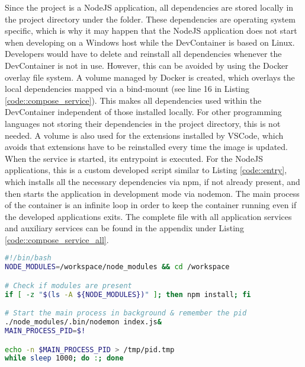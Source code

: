         Since the project is a NodeJS application, all dependencies are stored locally in the project directory under the  folder. These dependencies are operating system specific, which is why it may happen that the NodeJS application does not start when developing on a Windows host while the DevContainer is based on Linux. Developers would have to delete and reinstall all dependencies whenever the DevContainer is not in use. However, this can be avoided by using the Docker overlay file system. A volume managed by Docker is created, which overlays the local dependencies mapped via a bind-mount (see line 16 in Listing \ref{code::compose_service}). This makes all dependencies used within the DevContainer independent of those installed locally. For other programming languages not storing their dependencies in the project directory, this is not needed. A volume is also used for the extensions installed by VSCode, which avoids that extensions have to be reinstalled every time the image is updated.\newline
        When the service is started, its entrypoint is executed. For the NodeJS applications, this is a custom developed script similar to Listing \ref{code::entry}, which installs all the necessary dependencies via npm, if not already present, and then starts the application in development mode via nodemon. The main process of the container is an infinite loop in order to keep the container running even if the developed applications exits. The complete  file with all application services and auxiliary services can be found in the appendix under Listing \ref{code::compose_service_all}.\newline
        

\begin{lstlisting}[language=bash,caption={DevContainer \code{entryscript.sh}},breaklines=true,label={code::entry}]
#!/bin/bash
NODE_MODULES=/workspace/node_modules && cd /workspace

# Check if modules are present
if [ -z "$(ls -A ${NODE_MODULES})" ]; then npm install; fi

# Start the main process in background & remember the pid
./node_modules/.bin/nodemon index.js&
MAIN_PROCESS_PID=$!

echo -n $MAIN_PROCESS_PID > /tmp/pid.tmp
while sleep 1000; do :; done
\end{lstlisting}

